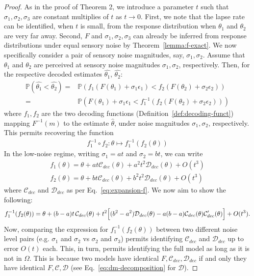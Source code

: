 \documentclass[si.tex]{subfiles}
\begin{document}
\begin{proof}
As in the proof of Theorem 2, we introduce a parameter $t$ such that $\sigma_1, \sigma_2, \sigma_3$ are constant multiplies of $t$ as $t\rightarrow 0$.
First, we note that the lapse rate can be identified, when $t$ is small, from the response distribution when $\theta_1$ and $\theta_2$ are very far away. 
Second, $F$ and $\sigma_1, \sigma_2, \sigma_3$ can already be inferred from response distributions under equal sensory noise by Theorem~\ref{lemma:f-exact}.
We now specifically consider a pair of sensory noise magnitudes, say, $\sigma_1, \sigma_2$.
Assume that $\theta_1$ and $\theta_2$ are perceived at sensory noise magnitudes $\sigma_1, \sigma_2$, respectively.
Then, for the respective decoded estimates $\widehat{\theta_1}$, $\widehat{\theta_2}$:
\begin{align*}
    \mathbb{P}(\widehat{\theta_1} < \widehat{\theta_2}) =& \mathbb{P}\left(f_1(F(\theta_1)+\sigma_1 \epsilon_1) < f_2(F(\theta_2)+\sigma_2 \epsilon_2)\right) \\
    =& \mathbb{P}\left(F(\theta_1)+\sigma_1 \epsilon_1 < f_1^{-1}(f_2(F(\theta_2)+\sigma_2 \epsilon_2))\right) 
\end{align*}
where $f_1, f_2$ are the two decoding functions (Definition~\ref{def:decoding-funct}) mapping $F^{-1}(m)$ to the estimate $\widehat{\theta}$, under noise magnitudes $\sigma_1, \sigma_2$, respectively.
This permits recovering the function
\begin{align*}
    f_1^{-1} \circ f_2 : \theta \mapsto f_1^{-1}(f_2(\theta))
\end{align*}
In the low-noise regime, writing $\sigma_1 = at$ and $\sigma_2 = bt$, we can write
\begin{align*}
    f_1(\theta) = \theta + at\mathcal{C}_{dec}(\theta)+ a^2t^2 \mathcal{D}_{dec}(\theta) + O(t^3) \\
    f_2(\theta) = \theta + bt\mathcal{C}_{dec}(\theta)+ b^2t^2 \mathcal{D}_{dec}(\theta) + O(t^3) 
\end{align*}
where $\mathcal{C}_{dec}$ and $\mathcal{D}_{dec}$ as per Eq.~\ref{eq:expansion-f}. 
We now aim to show the following:
\begin{equation}\label{eq:f1-f2-composed}
f_1^{-1}(f_2(\theta)) = \theta + (b-a)t\,\mathcal{C}_{dec}(\theta) + t^2\Bigl[(b^2-a^2)\mathcal{D}_{dec}(\theta)-a(b-a)\mathcal{C}_{dec}(\theta)\mathcal{C}_{dec}'(\theta)\Bigr] + O(t^3).
\end{equation}
Now, comparing the expression for $f_1^{-1}(f_2(\theta))$ between two different  noise level pairs (e.g. $\sigma_1$ and $\sigma_2$ vs $\sigma_2$ and $\sigma_3$) permits identifying $\mathcal{C}_{dec}$ and $\mathcal{D}_{dec}$ up to error $O(t)$ each.
This, in turn, permits identifying the full model as long as it is not in $\Omega$.
This is because two models have identical $F, \mathcal{C}_{dec}, \mathcal{D}_{dec}$ if and only they have identical $F, \mathcal{C}, \mathcal{D}$ (see Eq.~\ref{eq:dm-decomposition} for $\mathcal{D}$).



\end{proof}
\end{document}
